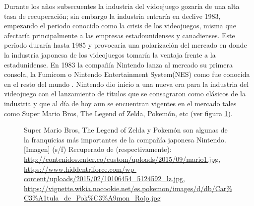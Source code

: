 	Durante los años subsecuentes la industria del vidoejuego gozaría de una alta 
	tasa de recuperación; sin embargo la industria entraría en declive 1983, 
	empezando el periodo conocido como la crisis de los videojuegos, misma que 
	afectaría principalmente a las empresas estadounidenses y canadienses. Este 
	periodo duraría hasta 1985 y provocaría una polarización del mercado en donde 
	la industria japonesa de los videojuegos tomaría la ventaja frente a la 
	estadunidense. En 1983 la compañía Nintendo lanza al mercado su primera consola, 
	la Fumicom o Nintendo Entertainment System(NES) como fue conocida en el resto 
	del mundo \cite{belli2008breve}. Nintendo dio inicio a una nueva era para la 
	industria del videojuego con el lanzamiento de títulos que se consagraron como 
	clásicos de la industria y que al día de hoy aun se encuentran vigentes en el 
	mercado tales como Super Mario Bros, The Legend of Zelda, Pokemón, etc (ver figura \ref{fig:Nintendo}).
	\\	
	\par
	
	\begin{figure}
  		\centering
   
 	
  		\caption{Super Mario Bros, The Legend of Zelda y Pokemón son algunas de la franquicias más importantes de la compañía japonesa Nintendo.[Imagen] (s/f) Recuperado de (respectivamente): \url{http://contenidos.enter.co/custom/uploads/2015/09/mario1.jpg}, \url{https://www.hiddentriforce.com/wp-content/uploads/2015/02/10106454_5124592_lz.jpg}, \url{https://vignette.wikia.nocookie.net/es.pokemon/images/d/db/Car\%C3\%A1tula_de_Pok\%C3\%A9mon_Rojo.jpg}}
  		\label{fig:Nintendo}
	\end{figure} 

